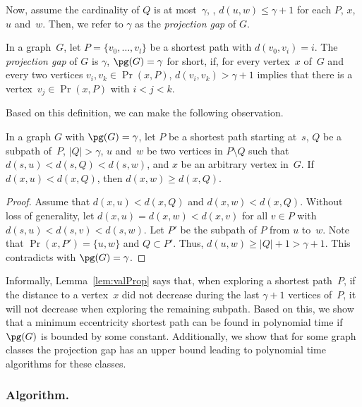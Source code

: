 Now, assume the cardinality of $Q$ is at most~$\gamma$, \ie, $d(u,w) \leq \gamma + 1$ for each $P$, $x$, $u$ and~$w$.
Then, we refer to $\gamma$ as the \emph{projection gap} of $G$.

\begin{definition}
In a graph~\( G \), let \( P = \{ v_0, \ldots, v_l \} \) be a shortest path with \( d(v_0, v_i) = i \).
The \emph{projection gap} of \( G \) is \( \gamma \), \( \pg(G) = \gamma \) for short, if, for every vertex~\( x \) of~\( G \) and every two vertices \( v_i, v_k \in \Pr(x, P) \), \( d(v_i, v_k) > \gamma + 1 \) implies that there is a vertex~\( v_j \in \Pr(x, P) \) with \( i < j < k \).
\end{definition}

Based on this definition, we can make the following observation.

\begin{lemma}
    \label{lem:valProp}
In a graph \( G \) with \( \pg(G) = \gamma \), let \( P \) be a shortest path starting at~\( s \), \( Q \) be a subpath of~\( P \), \( |Q| > \gamma \), \( u \) and~\( w \) be two vertices in \( P \setminus Q \) such that \( d(s, u) < d(s,Q) < d(s, w) \), and \( x \) be an arbitrary vertex in~\( G \).
If \( d(x, u) < d(x, Q) \), then \( d(x, w) \geq d(x, Q) \).
\end{lemma}

\begin{proof}
Assume that $d(x, u) < d(x, Q)$ and $d(x, w) < d(x, Q)$.
Without loss of generality, let $d(x, u) = d(x, w) < d(x, v)$ for all $v \in P$ with $d(s,u) < d(s,v) < d(s, w)$.
Let $P'$ be the subpath of $P$ from $u$ to~$w$.
Note that $\Pr(x, P') = \{ u, w \}$ and $Q \subset P'$.
Thus, $d(u, w) \geq |Q| + 1 > \gamma + 1$.
This contradicts with $\pg(G) = \gamma$.
\end{proof}

Informally, Lemma~\ref{lem:valProp} says that, when exploring a shortest path~$P$, if the distance to a vertex~$x$ did not decrease during the last $\gamma + 1$ vertices of~$P$, it will not decrease when exploring the remaining subpath.
Based on this, we show that a minimum eccentricity shortest path can be found in polynomial time if $\pg(G)$ is bounded by some constant.
Additionally, we show that for some graph classes the projection gap has an upper bound leading to polynomial time algorithms for these classes.

\subsubsection{Algorithm.}


